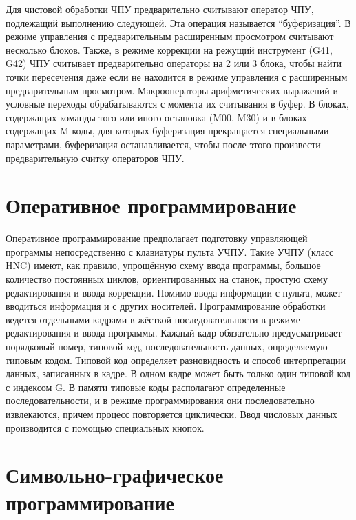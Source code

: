 Для чистовой обработки ЧПУ предварительно считывают оператор ЧПУ, подлежащий выполнению следующей. Эта операция называется ``буферизация''. В режиме управления с предварительным расширенным просмотром считывают несколько блоков. Также, в режиме коррекции на режущий инструмент (G41, G42) ЧПУ считывает предварительно операторы на 2 или 3 блока, чтобы найти точки пересечения даже если не находится в режиме управления с расширенным предварительным просмотром. Макрооператоры арифметических выражений и условные переходы обрабатываются с момента их считывания в буфер. В блоках, содержащих команды того или иного остановка (M00, M30) и в блоках содержащих M-коды, для которых буферизация прекращается специальными параметрами, буферизация останавливается, чтобы после этого произвести предварительную считку операторов ЧПУ.

\section{Оперативное программирование}

Оперативное программирование предполагает подготовку управляющей программы непосредственно с клавиатуры пульта УЧПУ. Такие УЧПУ (класс HNC) имеют, как правило, упрощённую схему ввода программы, большое количество постоянных циклов, ориентированных на станок, простую схему редактирования и ввода коррекции. Помимо ввода информации с пульта, может вводиться информация и с других носителей. Программирование обработки ведется отдельными кадрами в жёсткой последовательности в режиме редактирования и ввода программы. Каждый кадр обязательно предусматривает порядковый номер, типовой код, последовательность данных, определяемую типовым кодом. Типовой код определяет разновидность и способ интерпретации данных, записанных в кадре. В одном кадре может быть только один типовой код с индексом G. В памяти типовые коды располагают определенные последовательности, и в режиме программирования они последовательно извлекаются, причем процесс повторяется циклически. Ввод числовых данных производится с помощью специальных кнопок.

\section{Символьно-графическое программирование}

